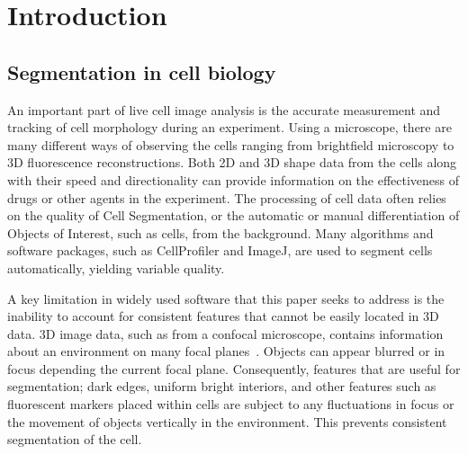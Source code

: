 
\chapter{Introduction}  %

\ifpdf
    \graphicspath{{Chapter1/Figs/Raster/}{Chapter1/Figs/PDF/}{Chapter1/Figs/}}
\else
    \graphicspath{{Chapter1/Figs/Vector/}{Chapter1/Figs/}}
\fi


\section{Segmentation in cell biology}

An important part of live cell image analysis is the accurate measurement and tracking of cell morphology during an experiment. Using a microscope, there are many different ways of observing the cells ranging from brightfield microscopy to 3D fluorescence reconstructions. Both 2D and 3D shape data from the cells along with their speed and directionality can provide information on the effectiveness of drugs or other agents in the experiment. The processing of cell data often relies on the quality of Cell Segmentation, or the automatic or manual differentiation of Objects of Interest, such as cells, from the background. Many algorithms and software packages, such as CellProfiler and ImageJ, are used to segment cells automatically, yielding variable quality.

A key limitation in widely used software that this paper seeks to address is the inability to account for consistent features that cannot be easily located in 3D data. 3D image data, such as from a confocal microscope, contains information about an environment on many focal planes~\cite{Carlsson:85}. Objects can appear blurred or in focus depending the current focal plane. Consequently, features that are useful for segmentation; dark edges, uniform bright interiors, and other features such as fluorescent markers placed within cells are subject to any fluctuations in focus or the movement of objects vertically in the environment. This prevents consistent segmentation of the cell.

